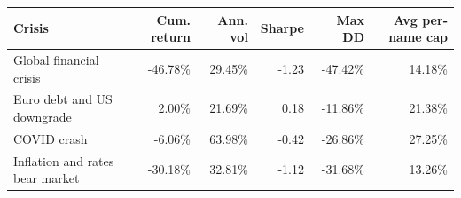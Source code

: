 \begin{tabular}{lrrrrr}
\hline
Crisis & Cum. return & Ann. vol & Sharpe & Max DD & Avg per-name cap \\
\hline
Global financial crisis & -46.78\% & 29.45\% & -1.23 & -47.42\% & 14.18\% \\
Euro debt and US downgrade & 2.00\% & 21.69\% & 0.18 & -11.86\% & 21.38\% \\
COVID crash & -6.06\% & 63.98\% & -0.42 & -26.86\% & 27.25\% \\
Inflation and rates bear market & -30.18\% & 32.81\% & -1.12 & -31.68\% & 13.26\% \\
\hline
\end{tabular}
